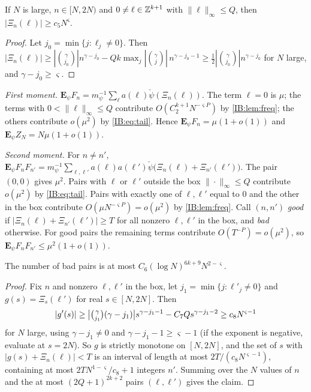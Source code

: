 \begin{lemma}
\label{IB:lem:freq}
If $N$ is large, $n\in[N,2N)$ and $0\ne\ell\in\mathbb{Z}^{k+1}$ with $\|\ell\|_\infty\le Q$, then
$|\Xi_n(\ell)|\ge c_5N^{\varsigma}$.
\end{lemma}

\begin{proof}
Let $j_0=\min\{j:\ell_j\ne0\}$. Then
$|\Xi_n(\ell)|\ge|\binom\gamma{j_0}|n^{\gamma-j_0}-Qk\max_j|\binom\gamma j|\,n^{\gamma-j_0-1}
\ge\frac12|\binom\gamma{j_0}|n^{\gamma-j_0}$ for $N$ large, and $\gamma-j_0\ge\varsigma$.
\end{proof}

\emph{First moment.} $\mathbf E_\psi F_n=m_\psi^{-1}\sum_\ell a(\ell)\check\psi(\Xi_n(\ell))$. The
term $\ell=0$ is $\mu$; the terms with $0<\|\ell\|_\infty\le Q$ contribute
$O(C_2^{k+1}N^{-\varsigma P})$ by \cref{IB:lem:freq}; the others contribute $o(\mu^2)$ by
\eqref{IB:eq:tail}. Hence $\mathbf E_\psi F_n=\mu(1+o(1))$ and
$\mathbf E_\psi Z_N=N\mu(1+o(1))$.

\emph{Second moment.} For $n\ne n'$,
$\mathbf E_\psi F_nF_{n'}=m_\psi^{-1}\sum_{\ell,\ell'}a(\ell)a(\ell')\check\psi\bigl(\Xi_n(\ell)+\Xi_{n'}(\ell')\bigr)$.
The pair $(0,0)$ gives $\mu^2$. Pairs with $\ell$ or $\ell'$ outside the box
$\|\cdot\|_\infty\le Q$ contribute $o(\mu^2)$ by \eqref{IB:eq:tail}. Pairs with exactly one
of $\ell,\ell'$ equal to $0$ and the other in the box contribute
$O(\mu N^{-\varsigma P})=o(\mu^2)$ by \cref{IB:lem:freq}. Call $(n,n')$ \emph{good} if
$|\Xi_n(\ell)+\Xi_{n'}(\ell')|\ge T$ for all nonzero $\ell,\ell'$ in the box, and
\emph{bad} otherwise. For good pairs the remaining terms contribute
$O(T^{-P})=o(\mu^2)$, so $\mathbf E_\psi F_nF_{n'}\le\mu^2(1+o(1))$.

\begin{lemma}
\label{IB:lem:bad}
The number of bad pairs is at most $C_6(\log N)^{6k+9}N^{2-\varsigma}$.
\end{lemma}

\begin{proof}
Fix $n$ and nonzero $\ell,\ell'$ in the box, let $j_1=\min\{j:\ell'_j\neq0\}$ and
$g(s)=\Xi_s(\ell')$ for real $s\in[N,2N]$. Then
\[
|g'(s)|\ge\bigl|\tbinom\gamma{j_1}(\gamma-j_1)\bigr|s^{\gamma-j_1-1}-C_7Qs^{\gamma-j_1-2}
\ge c_8N^{\varsigma-1}
\]
for $N$ large, using $\gamma-j_1\ne0$ and $\gamma-j_1-1\ge\varsigma-1$ (if the exponent is
negative, evaluate at $s=2N$). So $g$ is strictly monotone on $[N,2N]$, and the set
of $s$ with $|g(s)+\Xi_n(\ell)|<T$ is an interval of length at most $2T/(c_8N^{\varsigma-1})$,
containing at most $2TN^{1-\varsigma}/c_8+1$ integers $n'$. Summing over the $N$ values of $n$
and the at most $(2Q+1)^{2k+2}$ pairs $(\ell,\ell')$ gives the claim.
\end{proof}

